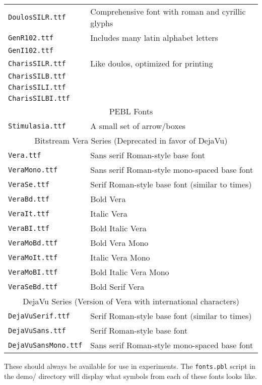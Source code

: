 \begin{table}[htbp]
\begin{tabular}{ll}
\texttt{DoulosSILR.ttf}&Comprehensive font with roman and cyrillic glyphs\\
\texttt{GenR102.ttf}& Includes many latin alphabet letters\\
\texttt{GenI102.ttf}& \\
\texttt{CharisSILR.ttf}& Like doulos, optimized for printing\\
\texttt{CharisSILB.ttf}&\\
\texttt{CharisSILI.ttf}& \\    
\texttt{CharisSILBI.ttf}& \\   
\midrule
\multicolumn{2}{c}{PEBL Fonts}\\
\texttt{Stimulasia.ttf}& A small set of arrow/boxes\\
\midrule
\multicolumn{2}{c}{Bitstream Vera Series (Deprecated in favor of DejaVu)}\\
\texttt{Vera.ttf}    &     Sans serif Roman-style base font\\
\texttt{VeraMono.ttf}&     Sans serif Roman-style mono-spaced base font\\
\texttt{VeraSe.ttf}  &     Serif Roman-style base font (similar to times)\\
\texttt{VeraBd.ttf}  &     Bold Vera\\
\texttt{VeraIt.ttf}  &     Italic Vera\\
\texttt{VeraBI.ttf}  &     Bold Italic Vera\\
\texttt{VeraMoBd.ttf}&     Bold Vera Mono\\
\texttt{VeraMoIt.ttf}&     Italic Vera Mono\\
\texttt{VeraMoBI.ttf}&     Bold Italic Vera Mono\\
\texttt{VeraSeBd.ttf}&     Bold Serif Vera\\
\midrule
\multicolumn{2}{c}{DejaVu Series (Version of Vera with
  international characters)}\\
\texttt{DejaVuSerif.ttf}    &     Serif Roman-style base font (similar to times)\\
\texttt{DejaVuSans.ttf}     &     Serif Roman-style base font\\
\texttt{DejaVuSansMono.ttf} &   Sans serif Roman-style mono-spaced base font\\

\bottomrule
\end{tabular}
\label{tab:fonts}
\end{table}



These should always be available for use in experiments.  The
\texttt{fonts.pbl} script in the demo/ directory will display what
symbols from each of these fonts looks like.

